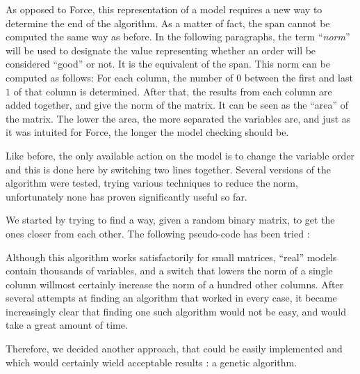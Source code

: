 \documentclass[12pt]{report}
\begin{document}
As opposed to Force, this representation of a model requires a new way to determine the end of the algorithm. As a matter of fact, the span cannot be computed the same way as before. In the following paragraphs, the term \enquote{\it{norm}} will be used to designate the value representing whether an order will be considered \enquote{good} or not. It is the equivalent of the span. This norm can be computed as follows:
For each column, the number of 0 between the first and last $1$ of that column is determined. After that, the results from each column are added together, and give the norm of the matrix. It can be seen as the \enquote{area} of the matrix. The lower the area, the more separated the variables are, and just as it was intuited for Force, the longer the model checking should be.

Like before, the only available action on the model is to change the variable order and this is done here by switching two lines together. Several versions of the algorithm were tested, trying various techniques to reduce the norm, unfortunately none has proven significantly useful so far. 

We started by trying to find a way, given a random binary matrix, to get the ones closer from each other. The following pseudo-code has been tried :

\begin{algorithm}
\begin{algorithmic}[1]
    \EndIf
  \EndWhile
\EndFunction
\end{algorithmic}
\end{algorithm}

Although this algorithm works satisfactorily for small matrices, \enquote{real} models contain thousands of variables, and a switch that lowers the norm of a single column willmost certainly increase the norm of a hundred other columns.
After several attempts at finding an algorithm that worked in every case, it became increasingly clear that finding one such algorithm would not be easy, and would take a great amount of time.

Therefore, we decided another approach, that could be easily implemented and which would certainly wield acceptable results : a genetic algorithm. 
\end{document}
